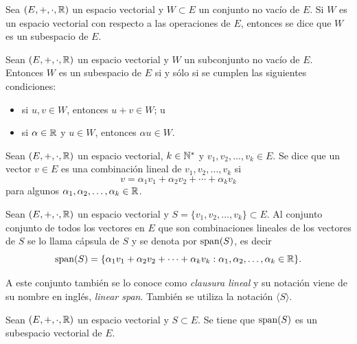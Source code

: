\documentclass[a4,11pt]{aleph-notas}
\begin{document}
\begin{defi}
    Sea $(E,+,\cdot,\mathbb{R})$ un espacio vectorial y $W \subset E$ un conjunto no vacío de $E$. Si $W$ es un espacio vectorial con respecto a las operaciones de $E$, entonces se dice que $W$ es un subespacio de $E$.
\end{defi}

\begin{teo}
    Sean $(E,+,\cdot,\mathbb{R})$ un espacio vectorial y $W$ un subconjunto no vacío de $E$. Entonces $W$ es un subespacio de $E$ si y sólo si se cumplen las siguientes condiciones:
    \begin{itemize}
    \item 
        si $u,v \in W$, entonces $u + v \in W$; u
    \item 
        si $\alpha \in \mathbb{R}$ y $u \in W$, entonces $\alpha u \in W$.
    \end{itemize}
\end{teo}

\begin{defi}
    Sean $(E,+,\cdot,\mathbb{R})$ un espacio vectorial, $k\in\mathbb{N}^*$ y $v_1, v_2, \ldots, v_k \in E$. Se dice que un vector $v \in E$ es una combinación lineal de 
    $v_1, v_2, \ldots, v_k$ si 
    \[
        v = \alpha_1 v_1 + \alpha_2 v_2 + \cdots + \alpha_k v_k
    \]
    para algunos $\alpha_1, \alpha_2, \ldots, \alpha_k \in \mathbb{R}$.
\end{defi}

\begin{defi}
    Sean $(E,+,\cdot,\mathbb{R})$ un espacio vectorial y $S = \{v_1, v_2, \ldots, v_k\} \subset E$. Al conjunto conjunto de todos los vectores en $E$ que son combinaciones lineales de los vectores de $S$ se lo llama cápsula de $S$ y se denota por $\operatorname{span}(S)$, es decir
    \[
        \operatorname{span}(S) = \{\alpha_1 v_1 + \alpha_2 v_2 + \cdots + \alpha_k v_k:\alpha_1, \alpha_2, \ldots, \alpha_k \in \mathbb{R}\}.
    \]
\end{defi}

\begin{advertencia}
    A este conjunto también se lo conoce como \emph{clausura lineal} y su notación viene de su nombre en inglés, \emph{linear span}. También se utiliza la notación $\langle S\rangle$.
\end{advertencia}

\begin{teo}
   Sean $(E,+,\cdot,\mathbb{R})$ un espacio vectorial y $S\subset E$. Se tiene que $\operatorname{span}(S)$ es un subespacio vectorial de $E$.
\end{teo}
\end{document}
